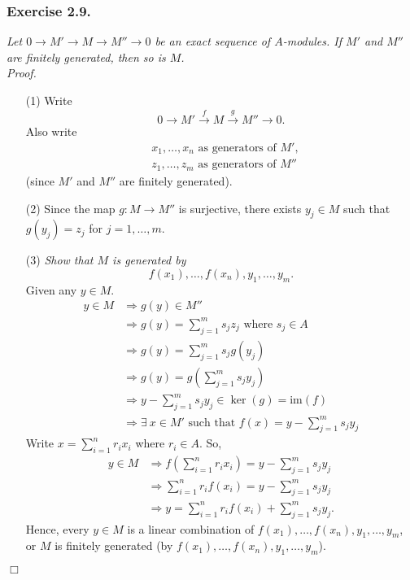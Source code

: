 \documentclass{article}
\begin{document}
\subsubsection*{Exercise 2.9.}
\emph{Let $0 \to M' \to M \to M'' \to 0$ be an exact sequence of $A$-modules.
If $M'$ and $M''$ are finitely generated, then so is $M$.} \\



\emph{Proof.}
\begin{enumerate}
\item[(1)]
  Write
  \[
    0 \to M' \xrightarrow{f} M \xrightarrow{g} M'' \to 0.
  \]
  Also write
  \begin{align*}
    &x_1, \ldots, x_n \text{ as generators of } M', \\
    &z_1, \ldots, z_m \text{ as generators of } M''
  \end{align*}
  (since $M'$ and $M''$ are finitely generated).

\item[(2)]
  Since the map $g: M \to M''$ is surjective,
  there exists $y_j \in M$ such that $g(y_j) = z_j$ for $j = 1, \ldots, m$.

\item[(3)]
  \emph{Show that $M$ is generated by}
  \[
    f(x_1), \ldots, f(x_n), y_1, \ldots, y_m.
  \]
  Given any $y \in M$.
  \begin{align*}
    y \in M
    &\Longrightarrow g(y) \in M'' \\
    &\Longrightarrow g(y) = \sum_{j=1}^{m} s_j z_j \text{ where } s_j \in A \\
    &\Longrightarrow g(y) = \sum_{j=1}^{m} s_j g(y_j) \\
    &\Longrightarrow g(y) = g\left( \sum_{j=1}^{m} s_j y_j \right) \\
    &\Longrightarrow y - \sum_{j=1}^{m} s_j y_j \in \ker(g) = \text{im}(f) \\
    &\Longrightarrow \exists \: x \in M' \text{ such that } f(x) = y - \sum_{j=1}^{m} s_j y_j
  \end{align*}
  Write $x = \sum_{i=1}^{n} r_i x_i$ where $r_i \in A$.
  So,
  \begin{align*}
    y \in M
    &\Longrightarrow f\left( \sum_{i=1}^{n} r_i x_i \right) = y - \sum_{j=1}^{m} s_j y_j \\
    &\Longrightarrow \sum_{i=1}^{n} r_i f(x_i) = y - \sum_{j=1}^{m} s_j y_j \\
    &\Longrightarrow y = \sum_{i=1}^{n} r_i f(x_i) + \sum_{j=1}^{m} s_j y_j.
  \end{align*}
  Hence, every $y \in M$ is a linear combination of
  $f(x_1), \ldots, f(x_n), y_1, \ldots, y_m$,
  or $M$ is finitely generated
  (by $f(x_1), \ldots, f(x_n), y_1, \ldots, y_m$).
\end{enumerate}
$\Box$ \\\\
\end{document}
